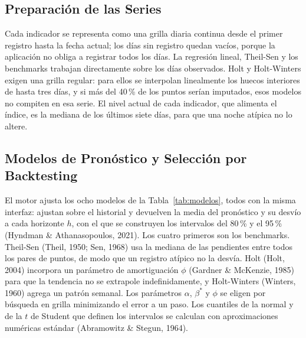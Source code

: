 \documentclass[12pt,letterpaper]{article}
\begin{document}
\subsection{Preparación de las Series}

Cada indicador se representa como una grilla diaria continua desde el primer
registro hasta la fecha actual; los días sin registro quedan vacíos, porque la
aplicación no obliga a registrar todos los días. La regresión lineal, Theil-Sen y
los benchmarks trabajan directamente sobre los días observados. Holt y
Holt-Winters exigen una grilla regular: para ellos se interpolan linealmente los
huecos interiores de hasta tres días, y si más del 40\,\% de los puntos serían
imputados, esos modelos no compiten en esa serie. El nivel actual de cada
indicador, que alimenta el índice, es la mediana de los últimos siete días, para
que una noche atípica no lo altere.

\subsection{Modelos de Pronóstico y Selección por Backtesting}

El motor ajusta los ocho modelos de la Tabla~\ref{tab:modelos}, todos con la misma
interfaz: ajustan sobre el historial y devuelven la media del pronóstico y su
desvío a cada horizonte $h$, con el que se construyen los intervalos del 80\,\% y
el 95\,\% (Hyndman \& Athanasopoulos, 2021). Los cuatro primeros son los
benchmarks. Theil-Sen (Theil, 1950; Sen, 1968) usa la mediana de las pendientes
entre todos los pares de puntos, de modo que un registro atípico no la desvía.
Holt (Holt, 2004) incorpora un parámetro de amortiguación $\phi$ (Gardner \&
McKenzie, 1985) para que la tendencia no se extrapole indefinidamente, y
Holt-Winters (Winters, 1960) agrega un patrón semanal. Los parámetros $\alpha$,
$\beta^*$ y $\phi$ se eligen por búsqueda en grilla minimizando el error a un paso.
Los cuantiles de la normal y de la $t$ de Student que definen los intervalos se
calculan con aproximaciones numéricas estándar (Abramowitz \& Stegun, 1964).
\end{document}
